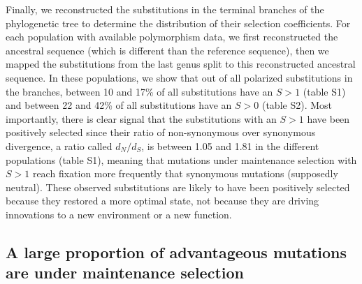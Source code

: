 \documentclass{article}
\newcommand{\dn}{d_N}
\newcommand{\ds}{d_S}
\newcommand{\dnds}{\dn / \ds}
\newcommand{\Sphy}{S}
\begin{document}
    Finally, we reconstructed the substitutions in the terminal branches of the phylogenetic tree to determine the distribution of their selection coefficients.
    For each population with available polymorphism data, we first reconstructed the ancestral sequence (which is different than the reference sequence), then we mapped the substitutions from the last genus split to this reconstructed ancestral sequence.
    In these populations, we show that out of all polarized substitutions in the branches, between 10 and 17\% of all substitutions have an $\Sphy > 1$ (table S1) and between 22 and 42\% of all substitutions have an $\Sphy > 0$ (table S2).
    Most importantly, there is clear signal that the substitutions with an $\Sphy > 1$ have been positively selected since their ratio of non-synonymous over synonymous divergence, a ratio called $\dnds$, is between 1.05 and 1.81 in the different populations (table S1), meaning that mutations under maintenance selection with $\Sphy > 1$ reach fixation more frequently that synonymous mutations (supposedly neutral).
    These observed substitutions are likely to have been positively selected because they restored a more optimal state, not because they are driving innovations to a new environment or a new function.

    \subsection*{A large proportion of advantageous mutations are under maintenance selection}
\end{document}
